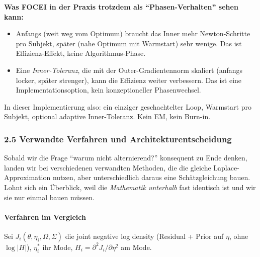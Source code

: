 \documentclass[
]{article}
\providecommand{\tightlist}{%
  \setlength{\itemsep}{0pt}\setlength{\parskip}{0pt}}
\begin{document}
\textbf{Was FOCEI in der Praxis trotzdem als ``Phasen-Verhalten'' sehen
kann:}

\begin{itemize}
\tightlist
\item
  Anfangs (weit weg vom Optimum) braucht das Inner mehr Newton-Schritte
  pro Subjekt, später (nahe Optimum mit Warmstart) sehr wenige. Das ist
  Effizienz-Effekt, keine Algorithmus-Phase.
\item
  Eine \emph{Inner-Toleranz}, die mit der Outer-Gradientennorm skaliert
  (anfangs locker, später strenger), kann die Effizienz weiter
  verbessern. Das ist eine Implementationsoption, kein konzeptioneller
  Phasenwechsel.
\end{itemize}

In dieser Implementierung also: ein einziger geschachtelter Loop,
Warmstart pro Subjekt, optional adaptive Inner-Toleranz. Kein EM, kein
Burn-in.

\subsubsection{2.5 Verwandte Verfahren und
Architekturentscheidung}\label{verwandte-verfahren-und-architekturentscheidung}

Sobald wir die Frage ``warum nicht alternierend?'' konsequent zu Ende
denken, landen wir bei verschiedenen verwandten Methoden, die die
gleiche Laplace-Approximation nutzen, aber unterschiedlich daraus eine
Schätzgleichung bauen. Lohnt sich ein Überblick, weil die
\emph{Mathematik unterhalb} fast identisch ist und wir sie nur einmal
bauen müssen.

\paragraph{Verfahren im Vergleich}\label{verfahren-im-vergleich}

Sei \(J_i(\theta, \eta_i, \Omega, \Sigma)\) die joint negative log
density (Residual + Prior auf \(\eta\), ohne \(\log|H|\)), \(\eta_i^*\)
ihr Mode, \(H_i = \partial^2 J_i / \partial \eta^2\) am Mode.
\end{document}
